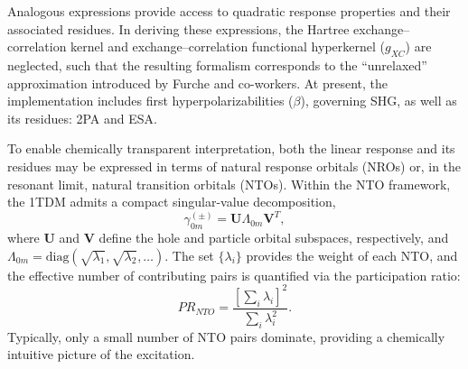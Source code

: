 \documentclass[%
 aip,
 amsmath,amssymb,
preprint,%
]{revtex4-2}
\begin{document}
Analogous expressions provide access to quadratic response properties and their associated residues.\cite{dewergifosseNonlinearresponsePropertiesSimplified2018,dewergifosseNonlinearresponsePropertiesSimplified2019,dewergifosseUltrafastEvaluationTwoPhoton2022}
In deriving these expressions, the Hartree exchange--correlation kernel and  exchange--correlation functional hyperkernel ($g_{XC}$) are neglected, such that the resulting formalism corresponds to the ``unrelaxed'' approximation introduced by Furche and co-workers.\cite{parkerQuadraticResponseProperties2018}
At present, the implementation includes first hyperpolarizabilities ($\beta$), governing SHG, as well as its residues: 2PA and ESA.

To enable chemically transparent interpretation, both the linear response and its residues may be expressed in terms of natural response orbitals (NROs)\cite{dewergifosseUnifiedStrategyChemically2020} or, in the resonant limit, natural transition orbitals (NTOs).\cite{dewergifosseAreFullyConjugated2019}  
Within the NTO framework, the 1TDM admits a compact singular-value decomposition,
\begin{equation}
	\gamma^{(\pm)}_{0m} = \mathbf U\Lambda_{0m}\mathbf V^T, \label{eq:ntos}
\end{equation}
where $\mathbf U$ and $\mathbf V$ define the hole and particle orbital subspaces, respectively, and $\Lambda_{0m} = \mathrm{diag}(\sqrt{\lambda_1},\sqrt{\lambda_2},\ldots)$.  
The set $\{\lambda_i\}$ provides the weight of each NTO, and the effective number of contributing pairs is quantified via the participation ratio:
\begin{equation*}
	PR_{NTO} = \frac{[\sum_i\lambda_i]^2}{\sum_i \lambda_i^2}.
\end{equation*}
Typically, only a small number of NTO pairs dominate, providing a chemically intuitive picture of the excitation.
\end{document}
